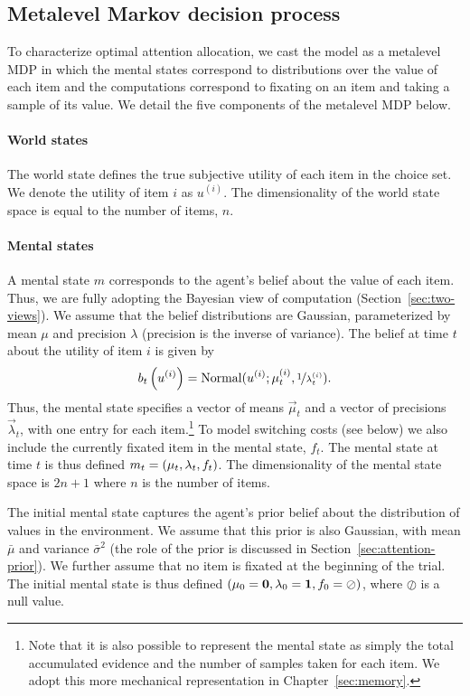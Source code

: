 \subsection{Metalevel Markov decision process}\label{sec:attention-mdp}

To characterize optimal attention allocation, we cast the model as a metalevel MDP in which the mental states correspond to distributions over the value of each item and the computations correspond to fixating on an item and taking a sample of its value. We detail the five components of the metalevel MDP below.

\paragraph{World states}
The world state defines the true subjective utility of each item in the choice set. We denote the utility of item $i$ as $u^{(i)}$. The dimensionality of the  world state space is equal to the number of items, $n$.

\paragraph{Mental states}
A mental state $m$ corresponds to the agent's belief about the value of each item. Thus, we are fully adopting the Bayesian view of computation (Section~\ref{sec:two-views}). We assume that the belief distributions are Gaussian, parameterized by mean $\mu$ and precision $\lambda$ (precision is the inverse of variance). The belief at time $t$ about the utility of item $i$ is given by
\begin{equation}
  b_t\left(u^{(i)}\right) = \mathrm{Normal}(u^{(i)}; \mu_t^{(i)}, \nicefrac{1}{\lambda_t^{(i)}}).
\end{equation}
Thus, the mental state specifies a vector of means $\vec{\mu}_t$ and a vector of precisions $\vec{\lambda}_t$, with one entry for each item.\footnote{%
  Note that it is also possible to represent the mental state as simply the total accumulated evidence and the number of samples taken for each item. We adopt this more mechanical representation in Chapter~\ref{sec:memory}.
} To model switching costs (see below) we also include the currently fixated item in the mental state, $f_t$. The mental state at time $t$ is thus defined $m_t = (\mathbf{\mu}_t, \mathbf{\lambda}_t, f_t)$. The dimensionality of the mental state space is $2n + 1$ where $n$ is the number of items.

The initial mental state captures the agent's prior belief about the distribution of values in the environment. We assume that this prior is also Gaussian, with mean $\bar{\mu}$ and variance $\bar{\sigma}^2$ (the role of the prior is discussed in Section~\ref{sec:attention-prior}). We further assume that no item is fixated at the beginning of the trial. The initial mental state is thus defined $(\mathbf{\mu}_0 = \textbf{0}, \mathbf{\lambda}_0 = \textbf{1}, f_0 = \oslash)$, where $\oslash$ is a null value.


